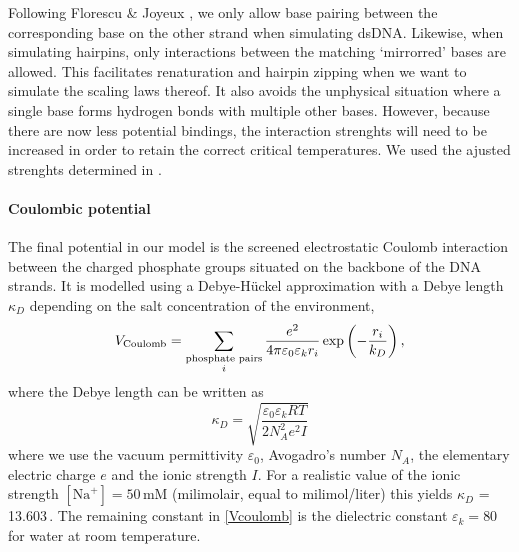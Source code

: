 Following Florescu \& Joyeux \cite{florescu2011thermal}, we only allow base pairing between the corresponding base on the other strand when simulating dsDNA. Likewise, when simulating hairpins, only interactions between the matching `mirrorred' bases are allowed. This facilitates renaturation and hairpin zipping when we want to simulate the scaling laws thereof. It also avoids the unphysical situation where a single base forms hydrogen bonds with multiple other bases. However, because there are now less potential bindings, the interaction strenghts will need to be increased in order to retain the correct critical temperatures. We used the ajusted strenghts determined in \cite{florescu2011thermal}.


\paragraph{Coulombic potential}
The final potential in our model is the screened electrostatic Coulomb interaction between the charged phosphate groups situated on the backbone of the DNA strands. It is modelled using a Debye-H\"uckel approximation with a Debye length $\kappa_D$ depending on the salt concentration of the environment,
\begin{equation}
V_\text{Coulomb}
= \sum_{\substack{\text{phosphate pairs}\\i}}
	\frac{e^2}{4 \pi \varepsilon_0 \varepsilon_k r_i}
       		\exp \left(- \frac{r_i}{k_D} \right),
\label{Vcoulomb}
\end{equation}
where the Debye length can be written as
\begin{equation}
\kappa_D
= \sqrt{ \frac{\varepsilon_0 \varepsilon_k RT}{2N^2_A e^2 I}}
\end{equation}
where we use the vacuum permittivity $\varepsilon_0$, Avogadro's number $N_A$, the elementary electric charge $e$ and the ionic strength $I$. For a realistic value of the ionic strength $[\text{Na}^+] = 50$\,mM (milimolair, equal to milimol/liter) this yields $\kappa_D$ = 13.603\,\Angstrom. The remaining constant in \eqref{Vcoulomb} is the dielectric constant $\varepsilon_k = 80$ for water at room temperature.


